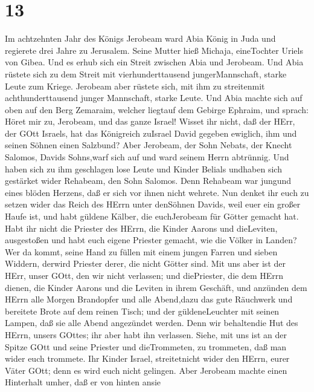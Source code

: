 \hypertarget{section-12}{%
\section{13}\label{section-12}}

 Im achtzehnten Jahr des Königs Jerobeam ward Abia König in
Juda  und regierete drei Jahre zu Jerusalem. Seine Mutter
hieß Michaja, eineTochter Uriels von Gibea. Und es erhub sich ein Streit
zwischen Abia und Jerobeam.  Und Abia rüstete sich zu dem
Streit mit vierhunderttausend jungerMannschaft, starke Leute zum Kriege.
Jerobeam aber rüstete sich, mit ihm zu streitenmit achthunderttausend
junger Mannschaft, starke Leute.  Und Abia machte sich auf
oben auf den Berg Zemaraim, welcher liegtauf dem Gebirge Ephraim, und
sprach: Höret mir zu, Jerobeam, und das ganze Israel! 
Wisset ihr nicht, daß der HErr, der GOtt Israels, hat das Königreich
zuIsrael David gegeben ewiglich, ihm und seinen Söhnen einen Salzbund?
 Aber Jerobeam, der Sohn Nebats, der Knecht Salomos, Davids
Sohns,warf sich auf und ward seinem Herrn abtrünnig.  Und
haben sich zu ihm geschlagen lose Leute und Kinder Belials undhaben sich
gestärket wider Rehabeam, den Sohn Salomos. Denn Rehabeam war jungund
eines blöden Herzens, daß er sich vor ihnen nicht wehrete. 
Nun denket ihr euch zu setzen wider das Reich des HErrn unter denSöhnen
Davids, weil euer ein großer Haufe ist, und habt güldene Kälber, die
euchJerobeam für Götter gemacht hat.  Habt ihr nicht die
Priester des HErrn, die Kinder Aarons und dieLeviten, ausgestoßen und
habt euch eigene Priester gemacht, wie die Völker in Landen?Wer da
kommt, seine Hand zu füllen mit einem jungen Farren und sieben Widdern,
derwird Priester derer, die nicht Götter sind.  Mit uns
aber ist der HErr, unser GOtt, den wir nicht verlassen; und diePriester,
die dem HErrn dienen, die Kinder Aarons und die Leviten in ihrem
Geschäft,  und anzünden dem HErrn alle Morgen Brandopfer
und alle Abend,dazu das gute Räuchwerk und bereitete Brote auf dem
reinen Tisch; und der güldeneLeuchter mit seinen Lampen, daß sie alle
Abend angezündet werden. Denn wir behaltendie Hut des HErrn, unsers
GOttes; ihr aber habt ihn verlassen.  Siehe, mit uns ist an
der Spitze GOtt und seine Priester und dieTrommeten, zu trommeten, daß
man wider euch trommete. Ihr Kinder Israel, streitetnicht wider den
HErrn, eurer Väter GOtt; denn es wird euch nicht gelingen. 
Aber Jerobeam machte einen Hinterhalt umher, daß er von hinten ansie
